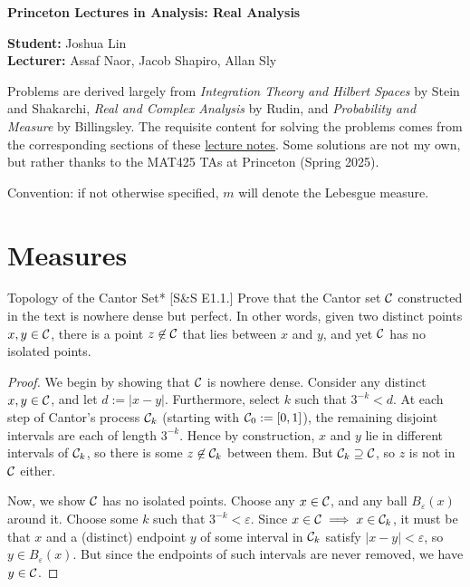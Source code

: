 






\begin{Large}
    \textsf{\textbf{Princeton Lectures in Analysis: Real Analysis}}
\end{Large}

\vspace{1ex}

\textsf{\textbf{Student:}} Joshua Lin \\
\textsf{\textbf{Lecturer:}} Assaf Naor, Jacob Shapiro, Allan Sly

\vspace{2ex}
Problems are derived largely from \emph{Integration Theory and Hilbert Spaces} by Stein and Shakarchi, \emph{Real and Complex Analysis} by Rudin, and \emph{Probability and Measure} by Billingsley. The requisite content for solving the problems comes from the corresponding sections of these \href{https://web.archive.org/web/20250630154205/https://web.math.princeton.edu/~js129/PDFs/teaching/MAT425_spring_2025/MAT425_Lecture_Notes.pdf}{lecture notes}. Some solutions are not my own, but rather thanks to the MAT425 TAs at Princeton (Spring 2025). 
\stdvspace

Convention: if not otherwise specified, \(m\) will denote the Lebesgue measure.

\section{Measures}

\begin{problem}{Topology of the Cantor Set}*
[S\&S E1.1.] Prove that the Cantor set \(\mathcal{C}\) constructed in the text is nowhere dense but perfect. In other words, given two distinct points \(x, y \in \mathcal{C}\), there is a point \(z \not\in \mathcal{C}\) that lies between \(x\) and \(y\), and yet \(\mathcal{C}\) has no isolated points. 
\end{problem}

\begin{proof}
    We begin by showing that \(\mathcal{C}\) is nowhere dense. Consider any distinct \(x, y \in \mathcal{C}\), and let \(d := |x - y|\). Furthermore, select \(k\) such that \(3^{-k} < d\). At each step of Cantor's process \(\mathcal{C}_k\) (starting with \(\mathcal{C}_0 := [0, 1]\)), the remaining disjoint intervals are each of length \(3^{-k}\). Hence by construction, \(x\) and \(y\) lie in different intervals of \(\mathcal{C}_k\), so there is some \(z \not\in \mathcal{C}_k\) between them. But \(\mathcal{C}_k \supseteq \mathcal{C}\), so \(z\) is not in \(\mathcal{C}\) either. 
    \stdvspace

    Now, we show \(\mathcal{C}\) has no isolated points. Choose any \(x \in \mathcal{C}\), and any ball \(B_{\varepsilon}(x)\) around it. Choose some \(k\) such that \(3^{-k} < \varepsilon\). Since \(x \in \mathcal{C} \implies x \in \mathcal{C}_k\), it must be that \(x\) and a (distinct) endpoint \(y\) of some interval in \(\mathcal{C}_k\) satisfy \(|x - y| < \varepsilon\), so \(y \in B_{\varepsilon}(x)\). But since the endpoints of such intervals are never removed, we have \(y \in \mathcal{C}\). 
\end{proof}

